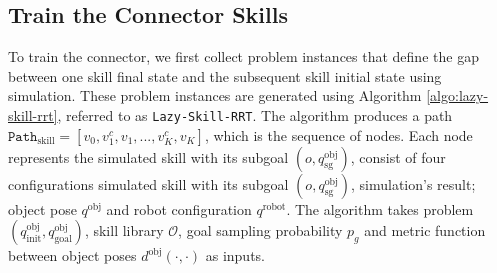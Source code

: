 



\subsection{Train the Connector Skills}










To train the connector, we first collect problem instances that define the gap between one skill final state and the subsequent skill initial state using simulation. These problem instances are generated using Algorithm \ref{algo:lazy-skill-rrt}, referred to as \texttt{Lazy-Skill-RRT}. The algorithm produces a path \(\texttt{Path}_\text{skill} = [v_0, v^c_1, v_1, ..., v^c_K, v_K]\), which is the sequence of nodes. Each node represents the simulated skill with its subgoal $(o, q^\text{obj}_\text{sg})$, consist of four configurations simulated skill with its subgoal $(o, q^\text{obj}_\text{sg})$, simulation's result; object pose $q^\text{obj}$ and robot configuration $q^\text{robot}$. The algorithm takes problem $(q^\text{obj}_\text{init}, q^\text{obj}_\text{goal})$, skill library $\mathcal{O}$, goal sampling probability $p_g$ and metric function between object poses $d^\text{obj}(\cdot, \cdot)$ as inputs.

